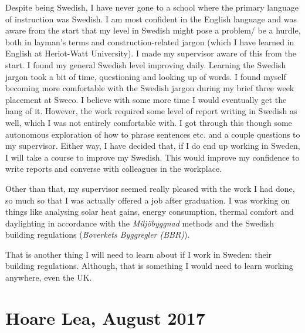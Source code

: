 Despite being Swedish, I have never gone to a school where the primary language of instruction was Swedish.
I am most confident in the English language and was aware from the start that my level in Swedish might pose a problem/ be a hurdle, both in layman's terms and construction-related jargon (which I have learned in English at Heriot-Watt University).
I made my supervisor aware of this from the start.
I found my general Swedish level improving daily.
Learning the Swedish jargon took a bit of time, questioning and looking up of words.
I found myself becoming more comfortable with the Swedish jargon during my brief three week placement at Sweco.
I believe with some more time I would eventually get the hang of it.
However, the work required some level of report writing in Swedish as well, which I was not entirely comfortable with.
I got through this though some autonomous exploration of how to phrase sentences etc. and a couple questions to my supervisor.
Either way, I have decided that, if I do end up working in Sweden, I will take a course to improve my Swedish.
This would improve my confidence to write reports and converse with colleagues in the workplace.

Other than that, my supervisor seemed really pleased with the work I had done, so much so that I was actually offered a job after graduation.
I was working on things like analysing solar heat gains, energy consumption, thermal comfort and daylighting in accordance with the \textit{Miljöbyggnad} methods and the Swedish building regulations (\textit{Boverkets Byggregler (BBR)}).

That is another thing I will need to learn about if I work in Sweden: their building regulations.
Although, that is something I would need to learn working anywhere, even the UK.




\section{Hoare Lea, August 2017}


